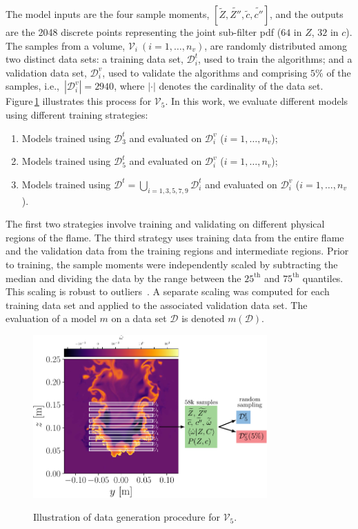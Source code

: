 \documentclass[review]{elsarticle}
\newcommand{\wt}[1]{\widetilde{#1}}
\begin{document}
The model inputs are the four sample moments,
$\left[ \wt{Z}, \wt{Z''}, \wt{c}, \wt{c''} \right]$, and the outputs
are the 2048 discrete points representing the joint sub-filter \gls{pdf}
($64$ in $Z$, $32$ in $c$). The samples from a volume,
$\mathcal{V}_i~(i=1,\dots, n_v)$, are randomly distributed among two
distinct data sets: a training data set, $\mathcal{D}_i^t$, used to
train the algorithms; and a validation data set, $\mathcal{D}_i^v$,
used to validate the algorithms and comprising $5\%$ of the samples,
i.e.,\ $|\mathcal{D}_i^v| = 2940$, where $|\cdot|$ denotes the
cardinality of the data set. Figure\,\ref{fig:gen_data} illustrates
this process for $\mathcal{V}_5$. In this work, we evaluate different
models using different training strategies:
\begin{enumerate}
\item Models trained using $\mathcal{D}_3^t$ and evaluated on $\mathcal{D}_i^v$ ($i=1, \dots, n_v$);
\item Models trained using $\mathcal{D}_5^t$ and evaluated on $\mathcal{D}_i^v$ ($i=1, \dots, n_v$);
\item Models trained using $\mathcal{D}^t = \bigcup\limits_{i=1, 3, 5, 7, 9} \mathcal{D}_i^t$ and evaluated on $\mathcal{D}_i^v$ ($i=1, \dots, n_v$).
\end{enumerate}
The first two strategies involve training and validating on different
physical regions of the flame. The third strategy uses training data
from the entire flame and the validation data from the training
regions and intermediate regions. Prior to training, the sample
moments were independently scaled by subtracting the median and
dividing the data by the range between the $25^\text{th}$ and
$75^\text{th}$ quantiles. This scaling is robust to
outliers~\cite{Pedregosa2011}. A separate scaling was computed for
each training data set and applied to the associated validation data
set. The evaluation of a model $m$ on a data set $\mathcal{D}$ is
denoted $m(\mathcal{D})$.

\begin{figure}[!tbp]%
  \centering%
  \includegraphics[width=0.8\textwidth]{./figs/gen_data.pdf}\\%
  \caption{Illustration of data generation procedure for $\mathcal{V}_5$.}\label{fig:gen_data}%
\end{figure}%
\end{document}

